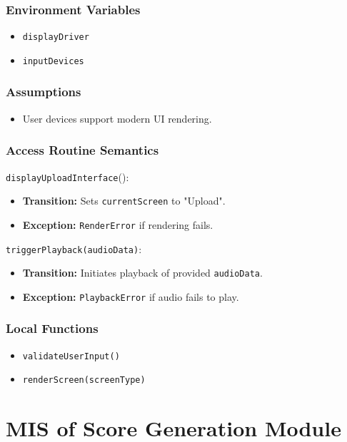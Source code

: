 \documentclass[12pt, titlepage]{article}
\begin{document}
\subsubsection{Environment Variables}  
\begin{itemize}  
    \item \texttt{displayDriver}  
    \item \texttt{inputDevices}  
\end{itemize}  

\subsubsection{Assumptions}  
\begin{itemize}  
    \item User devices support modern UI rendering.  
\end{itemize}  

\subsubsection{Access Routine Semantics}  

\noindent \texttt{displayUploadInterface}():
\begin{itemize}  
    \item \textbf{Transition:} Sets \texttt{currentScreen} to "Upload".  
    \item \textbf{Exception:} \texttt{RenderError} if rendering fails.  
\end{itemize}  

\noindent \texttt{triggerPlayback(audioData)}:
\begin{itemize}  
    \item \textbf{Transition:} Initiates playback of provided \texttt{audioData}.  
    \item \textbf{Exception:} \texttt{PlaybackError} if audio fails to play.  
\end{itemize}  

\subsubsection{Local Functions}  
\begin{itemize}  
    \item \texttt{validateUserInput()}  
    \item \texttt{renderScreen(screenType)}  
\end{itemize}  

\section{MIS of Score Generation Module} \label{M3}  
\end{document}
